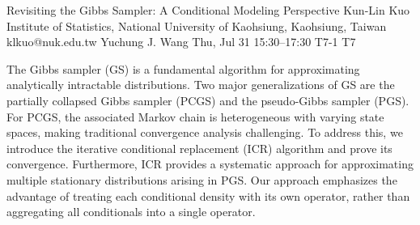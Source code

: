 \begin{talk}
  {Revisiting the Gibbs Sampler: A Conditional Modeling Perspective}%
  {Kun-Lin Kuo}%
  {Institute of Statistics, National University of Kaohsiung, Kaohsiung, Taiwan}%
  {klkuo@nuk.edu.tw}%
  {Yuchung J. Wang}%
  {}%
  {Thu, Jul 31 15:30–17:30}%
  {T7-1}%
  {T7}%
  {}%
				
			
The Gibbs sampler (GS) is a fundamental algorithm for approximating analytically intractable distributions.
Two major generalizations of GS are the partially collapsed Gibbs sampler (PCGS) and the pseudo-Gibbs sampler (PGS). For PCGS, the associated Markov chain is heterogeneous with varying state spaces, making traditional convergence analysis challenging. To address this, we introduce the iterative conditional replacement (ICR) algorithm and prove its convergence. Furthermore, ICR provides a systematic approach for approximating multiple stationary distributions arising in PGS.
Our approach emphasizes the advantage of treating each conditional density with its own operator, rather than aggregating all conditionals into a single operator.

\medskip

\end{talk}

